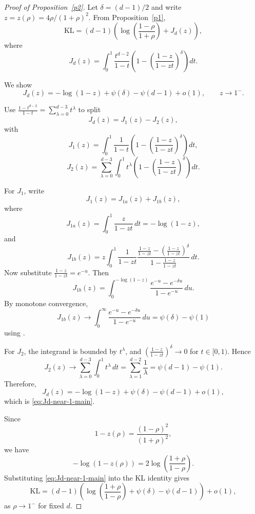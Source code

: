 \documentclass{article}
\begin{document}
\begin{proof}[Proof of Proposition~\ref{p2}]
Let \(\delta=(d-1)/2\) and write \(z=z(\rho)=4\rho/(1+\rho)^2\).
From Proposition~\ref{p1},
\[
\mathrm{KL}
= (d-1)\left(\log\left(\frac{1-\rho}{1+\rho}\right) + J_d(z)\right),
\]
where
\[
J_d(z)=\int_0^1 \frac{t^{d-2}}{1-t}\left(1-\left(\frac{1-z}{1-zt}\right)^\delta\right)dt.
\]

We show
\begin{equation}
J_d(z)= -\log(1-z) + \psi(\delta)-\psi(d-1)+o(1),
\qquad z\to 1^-.
\label{eq:Jd-near-1-main}
\end{equation}

Use
\(\frac{1-t^{d-2}}{1-t}=\sum_{\lambda=0}^{d-3} t^\lambda\)
to split
\[
J_d(z)=J_1(z)-J_2(z),
\]
with
\[
J_1(z)=\int_0^1 \frac{1}{1-t}\left(1-\left(\frac{1-z}{1-zt}\right)^\delta\right)dt,
\]
\[
J_2(z)=\sum_{\lambda=0}^{d-3}\int_0^1 t^\lambda\left(1-\left(\frac{1-z}{1-zt}\right)^\delta\right)dt.
\]

For \(J_1\), write
\[
J_1(z)=J_{1a}(z)+J_{1b}(z),
\]
where
\[
J_{1a}(z)=\int_0^1\frac{z}{1-zt}\,dt=-\log(1-z),
\]
and
\[
J_{1b}(z)=z\int_0^1\frac{1}{1-zt}
\frac{\frac{1-z}{1-zt}-\left(\frac{1-z}{1-zt}\right)^\delta}
{1-\frac{1-z}{1-zt}}\,dt.
\]
Now substitute \(\frac{1-z}{1-zt}=e^{-u}\). Then
\[
J_{1b}(z)=\int_0^{-\log(1-z)}\frac{e^{-u}-e^{-\delta u}}{1-e^{-u}}\,du.
\]
By monotone convergence,
\[
J_{1b}(z)\to\int_0^\infty\frac{e^{-u}-e^{-\delta u}}{1-e^{-u}}\,du
=\psi(\delta)-\psi(1)
\]
using \cite[5.9.12]{watson:DLMF}.

For \(J_2\), the integrand is bounded by \(t^\lambda\), and
\(\left(\frac{1-z}{1-zt}\right)^\delta\to 0\) for \(t\in[0,1)\). Hence
\[
J_2(z)\to\sum_{\lambda=0}^{d-3}\int_0^1 t^\lambda\,dt
=\sum_{\lambda=1}^{d-2}\frac{1}{\lambda}
=\psi(d-1)-\psi(1).
\]
Therefore,
\[
J_d(z)= -\log(1-z) + \psi(\delta)-\psi(d-1)+o(1),
\]
which is \eqref{eq:Jd-near-1-main}.

Since
\[
1-z(\rho)=\frac{(1-\rho)^2}{(1+\rho)^2},
\]
we have
\[
-\log(1-z(\rho))=2\log\left(\frac{1+\rho}{1-\rho}\right).
\]
Substituting \eqref{eq:Jd-near-1-main} into the KL identity gives
\[
\mathrm{KL}
=(d-1)\left(\log\left(\frac{1+\rho}{1-\rho}\right)+\psi(\delta)-\psi(d-1)\right)+o(1),
\]
as \(\rho\to 1^-\) for fixed \(d\).
\end{proof}
\end{document}
